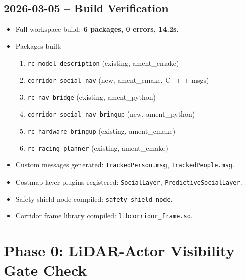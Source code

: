 \documentclass[11pt]{article}
\newcommand{\logentry}[1]{\subsection*{#1}}
\begin{document}
\logentry{2026-03-05 -- Build Verification}
\begin{itemize}
  \item Full workspace build: \textbf{6 packages, 0 errors, 14.2s}.
  \item Packages built:
  \begin{enumerate}
    \item \texttt{rc\_model\_description} (existing, ament\_cmake)
    \item \texttt{corridor\_social\_nav} (new, ament\_cmake, C++ + msgs)
    \item \texttt{rc\_nav\_bridge} (existing, ament\_python)
    \item \texttt{corridor\_social\_nav\_bringup} (new, ament\_python)
    \item \texttt{rc\_hardware\_bringup} (existing, ament\_cmake)
    \item \texttt{rc\_racing\_planner} (existing, ament\_cmake)
  \end{enumerate}
  \item Custom messages generated: \texttt{TrackedPerson.msg}, \texttt{TrackedPeople.msg}.
  \item Costmap layer plugins registered: \texttt{SocialLayer}, \texttt{PredictiveSocialLayer}.
  \item Safety shield node compiled: \texttt{safety\_shield\_node}.
  \item Corridor frame library compiled: \texttt{libcorridor\_frame.so}.
\end{itemize}

\newpage
\section{Phase 0: LiDAR-Actor Visibility Gate Check}
\end{document}
